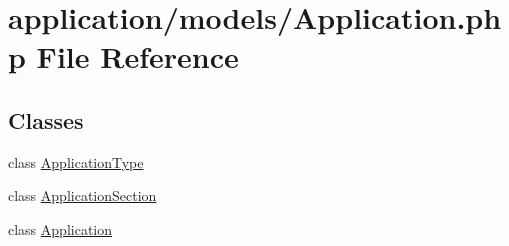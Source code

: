 \hypertarget{_application_8php}{\section{application/models/\-Application.php File Reference}
\label{_application_8php}
}
\subsection*{Classes}
\begin{DoxyCompactItemize}
\item 
class \hyperlink{class_application_type}{Application\-Type}
\item 
class \hyperlink{class_application_section}{Application\-Section}
\item 
class \hyperlink{class_application}{Application}
\end{DoxyCompactItemize}

